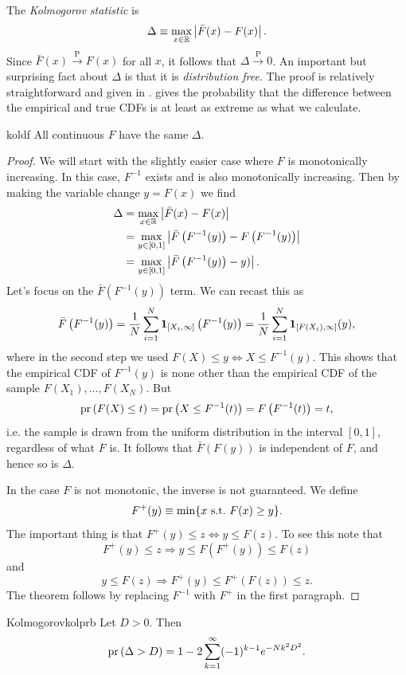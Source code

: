 The {\it Kolmogorov statistic} is
\begin{equation}
  \Delta\equiv\max_{x\in\mathbb{R}}\left|\bar{F}(x)-F(x)\right|.
\end{equation}
Since $\bar{F}(x)\xrightarrow{\text{P}}F(x)$ for all $x$, it follows
that $\Delta\xrightarrow{\text{P}}0$. An important but surprising
fact about $\Delta$ is that it is {\it distribution free}.
The proof is relatively straightforward and given in
.  gives
the probability that the difference between the empirical and true
CDFs is at least as extreme as what we calculate.
\begin{theorem}{}{koldf}
  All continuous $F$ have the same $\Delta$. 
  \begin{proof}
    We will start with the slightly easier case where $F$ is monotonically
    increasing. In this case, $F^{-1}$ exists and is also monotonically
    increasing. Then by making the variable change $y=F(x)$ we find
    \begin{equation*}
      \begin{aligned}
      \Delta&=\max_{x\in\mathbb{R}}\left|\bar{F}(x)-F(x)\right|\\
            &=\max_{y\in[0,1]}\left|
                \bar{F}\left(F^{-1}(y)\right)-F\left(F^{-1}(y)\right)\right|\\
            &=\max_{y\in[0,1]}\left|
                \bar{F}\left(F^{-1}(y)\right)-y)\right|.
      \end{aligned}
    \end{equation*}
    Let's focus on the $\bar{F}(F^{-1}(y))$ term. We can recast this as
    $$
      \bar{F}\left(F^{-1}(y)\right)
          =\frac{1}{N}\sum_{i=1}^N{\mathbf 1}_{[X_i,\infty]}\left(F^{-1}(y)\right)
          =\frac{1}{N}\sum_{i=1}^N{\mathbf 1}_{[F(X_i),\infty]}(y),
    $$
    where in the second step we used 
    $F(X)\leq y\Leftrightarrow X\leq F^{-1}(y)$. This shows that the
    empirical CDF of $F^{-1}(y)$ is none other than the empirical CDF 
    of the sample $F(X_1),...,F(X_N)$. But
    $$
      \operatorname{pr}\left(F(X)\leq t\right)=\operatorname{pr}\left(X\leq F^{-1}(t)\right)=F\left(F^{-1}(t)\right)=t,
    $$
    i.e. the sample is drawn from the uniform distribution in the
    interval $[0,1]$, regardless of what $F$ is. It follows that 
    $\bar{F}\left(F(y)\right)$ is independent of $F$, and hence so 
    is $\Delta$.

    In the case $F$ is not monotonic, the inverse is not guaranteed.
    We define
    $$
      F^+(y)\equiv\min\{x~\text{s.t.}~ F(x)\geq y\}.
    $$
    The important thing is that $F^+(y)\leq z\Leftrightarrow y\leq F(z)$.
    To see this note that
    $$
      F^+(y)\leq z \Rightarrow y\leq F\left(F^+(y)\right)\leq F(z)
    $$
    and
    $$
      y\leq F(z)\Rightarrow F^+(y)\leq F^+\left(F(z)\right)\leq z.
    $$
    The theorem follows by replacing $F^{-1}$ with $F^+$ 
    in the first paragraph.
  \end{proof}
\end{theorem}
\begin{theorem}{Kolmogorov}{kolprb}
  Let $D>0$. Then
  $$
    \operatorname{pr}\left(\Delta>D\right)=1-2\sum_{k=1}^\infty(-1)^{k-1}e^{-Nk^2D^2}.
  $$
\end{theorem}

